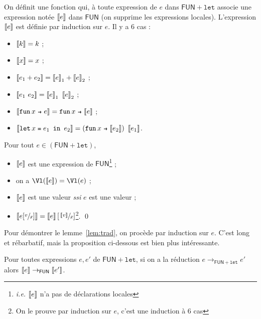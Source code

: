 \documentclass[../main]{subfiles}
\begin{document}
  On définit une fonction qui, à toute expression de $e$ dans $\mathsf{FUN}+\mathtt{let}$ associe une expression notée $\left\llbracket e\right\rrbracket$ dans $\mathsf{FUN}$ (on supprime les expressions locales).
  L'expression $\left\llbracket e\right\rrbracket$ est définie par induction sur $e$. Il y a 6 cas :
  \begin{itemize}
    \item $\left\llbracket k\right\rrbracket = k$ ;
    \item $\left\llbracket x\right\rrbracket = x$ ;
    \item $\left\llbracket e_1+e_2\right\rrbracket = \left\llbracket e\right\rrbracket_1 + \left\llbracket e\right\rrbracket_2$ ;
    \item $\left\llbracket e_1\ e_2\right\rrbracket = \left\llbracket e\right\rrbracket_1\ \left\llbracket e\right\rrbracket_2$ ;
    \item $\trad{\fun x e} = \fun x {\trad e}$ ;
    \item $\trad{\letin x {e_1} {e_2}} = (\fun x {\trad{e_2}})\ \trad{e_1}$.
  \end{itemize}

  \begin{lem}\label{lem:trad}
    Pour tout $e \in (\mathsf{FUN}+\mathtt{let})$,
    \begin{itemize}
      \item $\left\llbracket e\right\rrbracket$ est une expression de $\mathsf{FUN}$\footnote{\textit{i.e.} $\left\llbracket e\right\rrbracket$ n'a pas de déclarations locales} ;
      \item on a $\Vl(\trad e) = \Vl (e)$ ;
      \item $\left\llbracket e\right\rrbracket$ est une valeur \textit{ssi} $e$ est une valeur ;
      \item $\left\llbracket e[\sfrac{v}{x}]\right\rrbracket = \left\llbracket e\right\rrbracket [\sfrac{\left\llbracket v\right\rrbracket}{x}]$\footnote{On le prouve par induction sur $e$, c'est une induction à $6$ cas}.
    \qed
    \end{itemize}
  \end{lem}

  Pour démontrer le lemme~\ref{lem:trad}, on procède par induction sur $e$.
  C'est long et rébarbatif, mais la proposition ci-dessous est bien plus intéressante.

  \begin{prop}
    Pour toutes expressions $e, e'$ de $\mathsf{FUN}+\mathtt{let}$, si on a la réduction $e \to_{\mathsf{FUN}+\mathtt{let}} e'$ alors $\left\llbracket e\right\rrbracket \to_{\mathsf{FUN}} \left\llbracket e'\right\rrbracket$.
  \end{prop}
\end{document}

